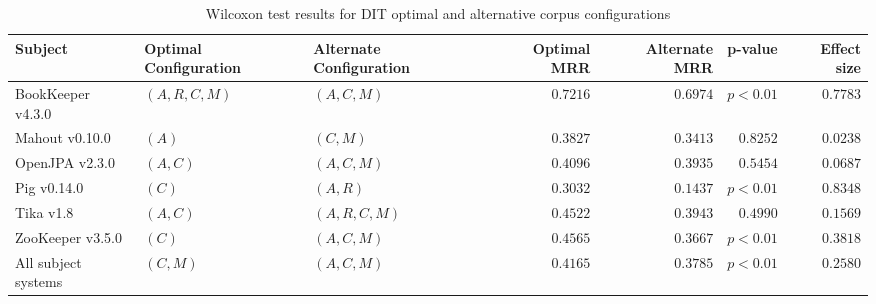\begin{landscape}
\begin{table}
\begin{spacing}{1.2}
\centering
\caption{Wilcoxon test results for DIT optimal and alternative corpus configurations}
\label{table:combo-dit-corpus-sweep-wilcox}
\begin{tabular}{lllrrrr}
\toprule
                      Subject & Optimal Configuration & Alternate Configuration & Optimal MRR & Alternate MRR &  p-value & Effect size \\
\midrule
            BookKeeper v4.3.0 &        $(A, R, C, M)$ &             $(A, C, M)$ &    $0.7216$ &      $0.6974$ & $p<0.01$ &    $0.7783$ \\
               Mahout v0.10.0 &                 $(A)$ &                $(C, M)$ &    $0.3827$ &      $0.3413$ & $0.8252$ &    $0.0238$ \\
               OpenJPA v2.3.0 &              $(A, C)$ &             $(A, C, M)$ &    $0.4096$ &      $0.3935$ & $0.5454$ &    $0.0687$ \\
                  Pig v0.14.0 &                 $(C)$ &                $(A, R)$ &    $0.3032$ &      $0.1437$ & $p<0.01$ &    $0.8348$ \\
                    Tika v1.8 &              $(A, C)$ &          $(A, R, C, M)$ &    $0.4522$ &      $0.3943$ & $0.4990$ &    $0.1569$ \\
             ZooKeeper v3.5.0 &                 $(C)$ &             $(A, C, M)$ &    $0.4565$ &      $0.3667$ & $p<0.01$ &    $0.3818$ \\
 \midrule
All subject systems &              $(C, M)$ &             $(A, C, M)$ &    $0.4165$ &      $0.3785$ & $p<0.01$ &    $0.2580$ \\
\bottomrule
\end{tabular}

\end{spacing}
\end{table}

\end{landscape}
